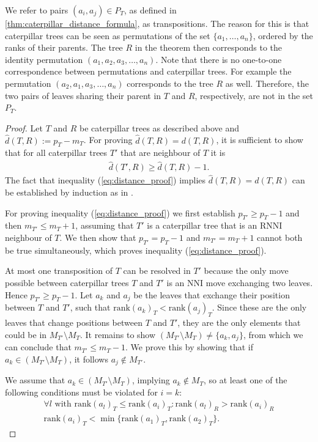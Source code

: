 \documentclass[11pt]{amsart}
\newcommand{\rnni}{\mathrm{RNNI}}
\newcommand{\rank}{\mathrm{rank}}
\newcommand{\nni}{\mathrm{NNI}}
\begin{document}
We refer to pairs $(a_i,a_j) \in P_T$, as defined in \autoref{thm:caterpillar_distance_formula}, as transpositions.
The reason for this is that caterpillar trees can be seen as permutations of the set $\{a_1, \ldots, a_n\}$, ordered by the ranks of their parents.
The tree $R$ in the theorem then corresponds to the identity permutation $(a_1, a_2, a_3, \ldots, a_n)$.
Note that there is no one-to-one correspondence between permutations and caterpillar trees.
For example the permutation $(a_2, a_1, a_3, \ldots, a_n)$ corresponds to the tree $R$ as well.
Therefore, the two pairs of leaves sharing their parent in $T$ and $R$, respectively, are not in the set $P_T$.

\begin{proof}
	Let $T$ and $R$ be caterpillar trees as described above and $\widehat d(T,R) := p_T - m_T$.
	For proving $\widehat d(T,R) = d(T,R)$, it is sufficient to show that for all caterpillar trees $T'$ that are neighbour of $T$ it is
	\begin{align}
		\widehat d(T',R) \geq \widehat d(T,R) - 1.
		\label{eq:distance_proof}
	\end{align}
	The fact that inequality (\ref{eq:distance_proof}) implies $\widehat d(T,R) = d(T,R)$ can be established by induction as in \autocite[Theorem 1]{Collienne2020-iu}.

	For proving inequality (\ref{eq:distance_proof}) we first establish $p_{T'} \geq p_T - 1$ and then $m_{T'} \leq m_T + 1$, assuming that $T'$ is a caterpillar tree that is an $\rnni$ neighbour of $T$.
	We then show that $p_{T'} = p_T - 1$ and $m_{T'} = m_T + 1$ cannot both be true simultaneously, which proves inequality (\ref{eq:distance_proof}).

	At most one transposition of $T$ can be resolved in $T'$ because the only move possible between caterpillar trees $T$ and $T'$ is an $\nni$ move exchanging two leaves.
	Hence $p_{T'} \geq p_T - 1$.
	Let $a_k$ and $a_j$ be the leaves that exchange their position between $T$ and $T'$, such that $\rank(a_k)_T < \rank(a_j)_T$.
	Since these are the only leaves that change positions between $T$ and $T'$, they are the only elements that could be in $M_{T'} \setminus M_T$.
	It remains to show $(M_{T'} \setminus M_T) \neq \{a_k, a_j\}$, from which we can conclude that $m_{T'} \leq m_T - 1$.
	We prove this by showing that if $a_k \in (M_{T'} \setminus M_T)$, it follows $a_j \notin M_{T'}$.

	We assume that $a_k \in (M_{T'} \setminus M_T)$, implying $a_k \notin M_T$, so at least one of the following conditions must be violated for $i = k$:
	\setcounter{equation}{0} %
	\renewcommand{\theequation}{C\arabic{equation}}
	\begin{align}
		\forall l \text{ with } \rank(a_l)_T \leq \rank(a_i)_T: \rank(a_l)_R > \rank(a_i)_R \label{condition1}\\
		\rank(a_i)_T < \min\{\rank(a_1)_T, \rank(a_2)_T\}.
		\label{condition2}
	\end{align}
	\setcounter{equation}{1}
	\renewcommand{\theequation}{\arabic{equation}}


\end{proof}
\end{document}
